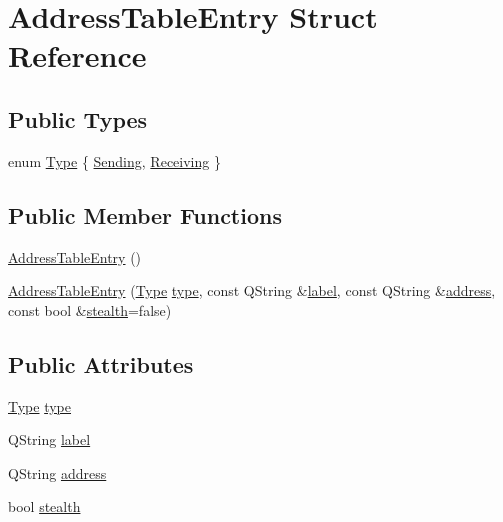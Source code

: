 \hypertarget{struct_address_table_entry}{}\section{Address\+Table\+Entry Struct Reference}
\label{struct_address_table_entry}
\subsection*{Public Types}
\begin{DoxyCompactItemize}
\item 
enum \hyperlink{struct_address_table_entry_afe73719f8e77468e712ed9006f437639}{Type} \{ \hyperlink{struct_address_table_entry_afe73719f8e77468e712ed9006f437639af6c38ef25827387d391de520f32ec7cf}{Sending}, 
\hyperlink{struct_address_table_entry_afe73719f8e77468e712ed9006f437639af74f02d02d0759cfa7a08306c8899a46}{Receiving}
 \}
\end{DoxyCompactItemize}
\subsection*{Public Member Functions}
\begin{DoxyCompactItemize}
\item 
\hyperlink{struct_address_table_entry_a5eda451b6257f5bb197278da55cf08b2}{Address\+Table\+Entry} ()
\item 
\hyperlink{struct_address_table_entry_a77128883bfe0db5ad3c77f5065874482}{Address\+Table\+Entry} (\hyperlink{struct_address_table_entry_afe73719f8e77468e712ed9006f437639}{Type} \hyperlink{struct_address_table_entry_a2e782e5239a5adae62eaa81746f55314}{type}, const Q\+String \&\hyperlink{struct_address_table_entry_a4a427495652b7716f84aa88b2cb4f296}{label}, const Q\+String \&\hyperlink{struct_address_table_entry_ae36a700ca64a079d26f8aedce1ad9155}{address}, const bool \&\hyperlink{struct_address_table_entry_a8c0c9270d5fbe170c712d4e0fa9b5d06}{stealth}=false)
\end{DoxyCompactItemize}
\subsection*{Public Attributes}
\begin{DoxyCompactItemize}
\item 
\hyperlink{struct_address_table_entry_afe73719f8e77468e712ed9006f437639}{Type} \hyperlink{struct_address_table_entry_a2e782e5239a5adae62eaa81746f55314}{type}
\item 
Q\+String \hyperlink{struct_address_table_entry_a4a427495652b7716f84aa88b2cb4f296}{label}
\item 
Q\+String \hyperlink{struct_address_table_entry_ae36a700ca64a079d26f8aedce1ad9155}{address}
\item 
bool \hyperlink{struct_address_table_entry_a8c0c9270d5fbe170c712d4e0fa9b5d06}{stealth}
\end{DoxyCompactItemize}


